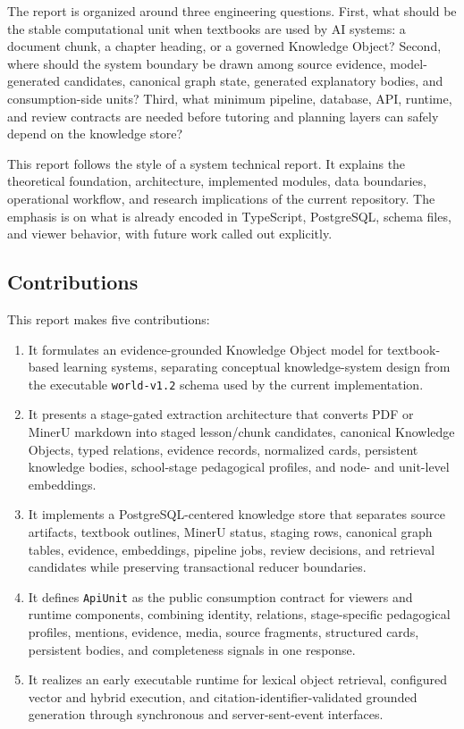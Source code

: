 \documentclass[11pt,letterpaper]{article}
\newcommand{\code}[1]{\nolinkurl{#1}}
\begin{document}
The report is organized around three engineering questions. First, what should be the stable computational unit when textbooks are used by AI systems: a document chunk, a chapter heading, or a governed Knowledge Object? Second, where should the system boundary be drawn among source evidence, model-generated candidates, canonical graph state, generated explanatory bodies, and consumption-side units? Third, what minimum pipeline, database, API, runtime, and review contracts are needed before tutoring and planning layers can safely depend on the knowledge store?

This report follows the style of a system technical report. It explains the theoretical foundation, architecture, implemented modules, data boundaries, operational workflow, and research implications of the current repository. The emphasis is on what is already encoded in TypeScript, PostgreSQL, schema files, and viewer behavior, with future work called out explicitly.

\subsection{Contributions}

This report makes five contributions:

\begin{enumerate}
  \item It formulates an evidence-grounded Knowledge Object model for textbook-based learning systems, separating conceptual knowledge-system design from the executable \code{world-v1.2} schema used by the current implementation.
  \item It presents a stage-gated extraction architecture that converts PDF or MinerU markdown into staged lesson/chunk candidates, canonical Knowledge Objects, typed relations, evidence records, normalized cards, persistent knowledge bodies, school-stage pedagogical profiles, and node- and unit-level embeddings.
  \item It implements a PostgreSQL-centered knowledge store that separates source artifacts, textbook outlines, MinerU status, staging rows, canonical graph tables, evidence, embeddings, pipeline jobs, review decisions, and retrieval candidates while preserving transactional reducer boundaries.
  \item It defines \code{ApiUnit} as the public consumption contract for viewers and runtime components, combining identity, relations, stage-specific pedagogical profiles, mentions, evidence, media, source fragments, structured cards, persistent bodies, and completeness signals in one response.
  \item It realizes an early executable runtime for lexical object retrieval, configured vector and hybrid execution, and citation-identifier-validated grounded generation through synchronous and server-sent-event interfaces.
\end{enumerate}
\end{document}
